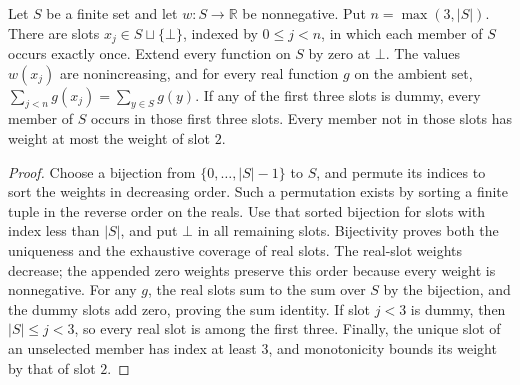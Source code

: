 \begin{lemma}
Let $S$ be a finite set and let $w:S\to\mathbb R$ be nonnegative.
Put $n=\max(3,|S|)$. There are slots $x_j\in S\sqcup\{\bot\}$,
indexed by $0\le j<n$, in which each member of $S$ occurs exactly once.
Extend every function on $S$ by zero at $\bot$. The values $w(x_j)$
are nonincreasing, and for every real function $g$ on the ambient set,
$\sum_{j<n}g(x_j)=\sum_{y\in S}g(y)$.
If any of the first three slots is dummy, every member of $S$ occurs
in those first three slots. Every member not in those slots has weight
at most the weight of slot $2$.
\end{lemma}
\begin{proof}
Choose a bijection from $\{0,\ldots,|S|-1\}$ to $S$, and permute its
indices to sort the weights in decreasing order. Such a permutation
exists by sorting a finite tuple in the reverse order on the reals.
Use that sorted bijection for slots with index less than $|S|$, and
put $\bot$ in all remaining slots. Bijectivity proves both the uniqueness
and the exhaustive coverage of real slots. The real-slot weights decrease;
the appended zero weights preserve this order because every weight is
nonnegative. For any $g$, the real slots sum to the sum over $S$ by the
bijection, and the dummy slots add zero, proving the sum identity.
If slot $j<3$ is dummy, then $|S|\le j<3$, so every real slot is among
the first three. Finally, the unique slot of an unselected member has
index at least $3$, and monotonicity bounds its weight by that of slot $2$.
\end{proof}
